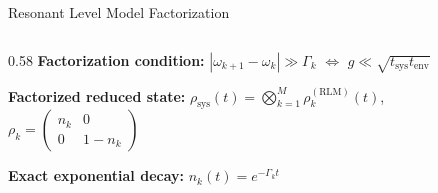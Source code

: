 \documentclass[aspectratio=169,11pt]{beamer}
\begin{document}
\begin{frame}{Resonant Level Model Factorization}
\small
    \begin{columns}
        \begin{column}{0.58\textwidth}
            \textbf{Factorization condition:}
            $|\omega_{k+1}-\omega_k| \gg \Gamma_k$ $\Longleftrightarrow$ $g \ll \sqrt{t_{\mathrm{sys}} t_{\mathrm{env}}}$

            \vspace{-0.1cm}
            \textbf{Factorized reduced state:}
            $\rho_{\mathrm{sys}}(t) = \bigotimes_{k=1}^M \rho_k^{(\mathrm{RLM})}(t)$, \; $\rho_k = \begin{pmatrix} n_k & 0 \\ 0 & 1{-}n_k \end{pmatrix}$

            \vspace{0.1cm}
            \textbf{Exact exponential decay:} $n_k(t) = e^{-\Gamma_k t}$


\end{column}
\end{columns}
\end{frame}
\end{document}
